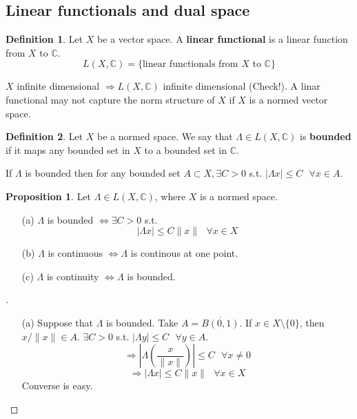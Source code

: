 \documentclass{article}
\theoremstyle{definition}
\newtheorem{dfn}{Definition}
\newtheorem{prop}{Proposition}
\newenvironment{proofs}[1][\proofname]{%
  \begin{proof}[#1]$ $\par\nobreak\ignorespaces
}{%
  \end{proof}
}
\newcommand{\sfa}{\text{  } \forall}
\newcommand{\Lra}{\Leftrightarrow}
\begin{document}
\subsection{Linear functionals and dual space}

\begin{dfn}
	Let $X$ be a vector space. A \textbf{linear functional} is a linear function from $X$ to $\mathbb{C}$. 
  \[
    L(X, \mathbb{C}) = \{\text{linear functionals from }X \text{ to } \mathbb{C}\}
  \]
\end{dfn}

$X$ infinite dimensional $\Rightarrow L(X, \mathbb{C})$ infinite dimensional (Check!). A linar functional may not capture the norm structure of $X$ if $X$ is a normed vector space. 

\begin{dfn}
	Let $X$ be a normed space. We say that $\Lambda \in L(X, \mathbb{C})$ is \textbf{bounded} if it maps any bounded set in $X$ to a bounded set in $\mathbb{C}$. 
\end{dfn}

If $\Lambda$ is bounded then for any bounded set $A \subset X, \exists C > 0$ s.t. $|\Lambda x| \leq C \sfa x \in A$.

\begin{prop}
  Let $\Lambda \in L(X, \mathbb{C})$, where $X$ is a normed space. 
  \begin{enumerate}
    \item[(a)] $\Lambda$ is bounded $\Lra \exists C > 0$ s.t.
      \[
        |\Lambda x| \leq C \| x \| \sfa x \in X
      \]
    \item[(b)] $\Lambda$ is continuous $\Lra \Lambda$ is continous at one point. 
    \item[(c)] $\Lambda$ is continuity $\Lra \Lambda$ is bounded. 
  \end{enumerate}
\end{prop}

\begin{proofs}
  \begin{enumerate}
    \item[(a)] Suppose that $\Lambda$ is bounded. Take $A = \overline{B(0, 1)}$. If $x \in X\setminus \{0\}$, then $x/\|x\| \in A$. $\exists C > 0$ s.t. $|\Lambda y| \leq C \sfa y \in A$. 
      \[
        \Rightarrow \left|\Lambda \left(\frac{x}{\|x\|} \right)\right| \leq C \sfa x \neq 0
      \]
      \[
        \Rightarrow |\Lambda x| \leq C \|x\| \sfa x \in X
      \]
      Converse is easy. 
  \end{enumerate}
\end{proofs}
\end{document}
